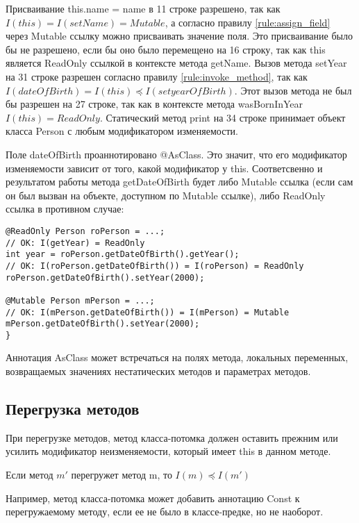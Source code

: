 Присваивание this.name = name в 11 строке разрешено, так как $I(this) = I(setName) = Mutable$, а согласно правилу \ref{rule:assign_field} через Mutable ссылку можно присваивать значение поля. Это присваивание было бы не разрешено, если бы оно было перемещено  на 16 строку, так как this является ReadOnly ссылкой в контексте метода getName. Вызов метода setYear на 31 строке разрешен согласно правилу \ref{rule:invoke_method}, так как $I(dateOfBirth) = I(this) \preceq I(setyearOfBirth)$. Этот вызов метода не был бы разрешен на 27 строке, так как в контексте метода wasBornInYear $I(this) = ReadOnly$. Статический метод print на 34 строке принимает объект класса Person с любым модификатором изменяемости. 

Поле dateOfBirth проаннотировано @AsClass. Это значит, что его модификатор изменяемости зависит от того, какой модификатор у this. Соответсвенно и результатом работы метода getDateOfBirth будет либо Mutable ссылка (если сам он был вызван на объекте, доступном по Mutable ссылке), либо ReadOnly ссылка в противном случае:

\begin{lstlisting}[caption=Использование аннотации AsClass, label=code:as_class]
@ReadOnly Person roPerson = ...;
// OK: I(getYear) = ReadOnly
int year = roPerson.getDateOfBirth().getYear(); 
// OK: I(roPerson.getDateOfBirth()) = I(roPerson) = ReadOnly
roPerson.getDateOfBirth().setYear(2000); 
	
@Mutable Person mPerson = ...;
// OK: I(mPerson.getDateOfBirth()) = I(mPerson) = Mutable
mPerson.getDateOfBirth().setYear(2000); 
}
\end{lstlisting} 

Аннотация AsClass может встречаться на полях метода, локальных переменных, возвращаемых значениях нестатических методов и параметрах методов.

\subsection{Перегрузка методов}

При перегрузке методов, метод класса-потомка должен оставить прежним или усилить модификатор неизменяемости, который имеет this в данном методе. 

\begin{Rule}\label{rule:override_method}
Если метод $m'$ перегружет метод m, то $I(m) \preceq I(m')$
\end{Rule}

Например, метод класса-потомка может добавить аннотацию Const к перегружаемому методу, если ее не было в классе-предке, но не наоборот. 

